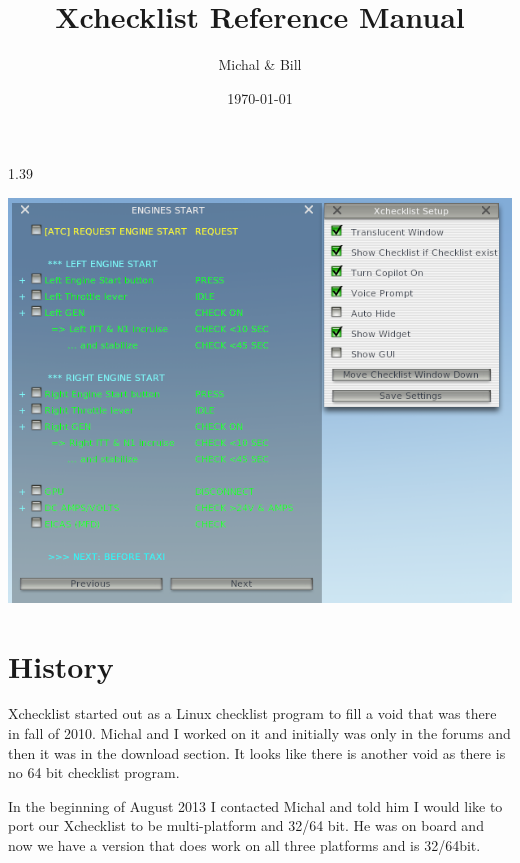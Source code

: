 \documentclass[11pt,parskip=half,a4paper]{scrartcl}
\begin{document}
\title{Xchecklist Reference Manual}
\author{Michal \& Bill}
\date{\today}

\maketitle

\begin{center}
1.39
\end{center}

\vspace{2cm}


\begin{center}
\includegraphics[width=14cm]{TranslucentXchecklist.png}
\end{center}


\thispagestyle{empty}
\newpage
\verb||
\tableofcontents

\newpage
\section{History}

Xchecklist started out as a Linux checklist program to fill a void that was there in fall of 2010. Michal and I worked on it and initially was only in the forums and then it was in the download section. It looks like there is another void as there is no 64 bit checklist program. \newline

In the beginning of August 2013 I contacted Michal and told him I would like to port our Xchecklist to be multi-platform and 32/64 bit. He was on board and now we have a version that does work on all three platforms and is 32/64bit.
\end{document}
